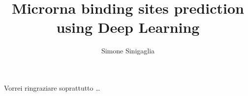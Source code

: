 \documentclass[
12pt, %
english, %
singlespacing, %
headsepline, %
]{report} %
\begin{document}
	\title{Microrna binding sites prediction \\
		using Deep Learning}
	\author{Simone Sinigaglia}
	
	\beforepreface
	Vorrei ringraziare soprattutto \dots
	\afterpreface
	
	
	
%
%



	
	\appendix %
	




\end{document}
